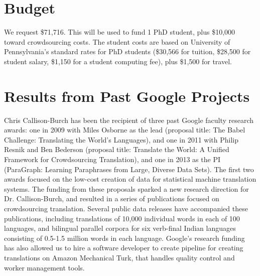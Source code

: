 \documentclass[11pt]{article}
\begin{document}



\section{Budget}

We request \$71,716.  This will be used to fund 1 PhD student, plus \$10,000 toward crowdsourcing costs.  The student costs are based on
University of Pennsylvania's standard rates for PhD students (\$30,566
for tuition, \$28,500 for student salary, \$1,150 for a student
computing fee), plus \$1,500 for travel.  


\section{Results from Past Google Projects}

Chris Callison-Burch has been the recipient of three past Google faculty
research awards: one in 2009 with Miles Osborne as the lead (proposal
title: The Babel Challenge: Translating the World's Languages), and
one in 2011 with Philip Resnik and Ben Bederson (proposal title:
Translate the World: A Unified Framework for Crowdsourcing
Translation), and one in 2013 as the PI (ParaGraph: Learning Paraphrases from Large, Diverse Data
  Sets).  The first two awards focused on the low-cost creation of data for
statistical machine translation systems.  The funding from these
proposals sparked a new research direction for Dr. Callison-Burch, and
resulted in a series of publications focused on crowdsourcing
translation.
Several public data releases have accompanied these publications,
including translations of 10,000 individual words in each of 100
languages, and bilingual parallel corpora for six verb-final Indian
languages consisting of 0.5-1.5 million words in each language.
Google's research funding has also allowed us to hire a software
developer to create pipeline for creating translations on Amazon
Mechanical Turk, that handles quality control and worker management
tools. 





\end{document}
